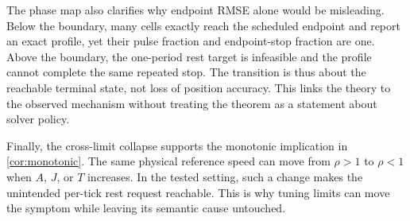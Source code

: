 The phase map also clarifies why endpoint RMSE alone would be misleading. Below the boundary, many cells exactly reach the scheduled endpoint and report an exact profile, yet their pulse fraction and endpoint-stop fraction are one. Above the boundary, the one-period rest target is infeasible and the profile cannot complete the same repeated stop. The transition is thus about the reachable terminal state, not loss of position accuracy. This links the theory to the observed mechanism without treating the theorem as a statement about solver policy.

Finally, the cross-limit collapse supports the monotonic implication in \cref{cor:monotonic}. The same physical reference speed can move from $\rho>1$ to $\rho<1$ when $A$, $J$, or $T$ increases. In the tested setting, such a change makes the unintended per-tick rest request reachable. This is why tuning limits can move the symptom while leaving its semantic cause untouched.

